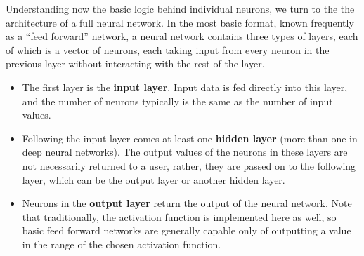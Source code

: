 \documentclass{article}
\begin{document}
Understanding now the basic logic behind individual neurons, we turn to the the architecture of a full neural network. In the most basic format, known frequently as a ``feed forward'' network, a neural network contains three types of layers, each of which is a vector of neurons, each taking input from every neuron in the previous layer without interacting with the rest of the layer.
\begin{itemize}
\item{The first layer is the \textbf{input layer}. Input data is fed directly into this layer, and the number of neurons typically is the same as the number of input values.}
\item{Following the input layer comes at least one \textbf{hidden layer} (more than one in deep neural networks). The output values of the neurons in these layers are not necessarily returned to a user, rather, they are passed on to the following layer, which can be the output layer or another hidden layer.}
\item{Neurons in the \textbf{output layer} return the output of the neural network. Note that traditionally, the activation function is implemented here as well, so basic feed forward networks are generally capable only of outputting a value in the range of the chosen activation function.}
\end{itemize}

\begin{center}
\end{center}
\end{document}
